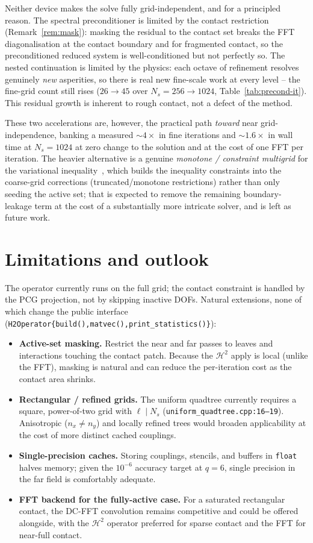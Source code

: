 \documentclass[11pt,a4paper]{article}
\newcommand{\Htwo}{\mathcal{H}^2}
\newcommand{\code}[1]{\texttt{#1}}
\theoremstyle{definition}
\theoremstyle{remark}
\begin{document}
Neither device makes the solve fully grid-independent, and for a principled
reason. The spectral preconditioner is limited by the contact restriction
(Remark~\ref{rem:mask}): masking the residual to the contact set breaks the FFT
diagonalisation at the contact boundary and for fragmented contact, so the
preconditioned reduced system is well-conditioned but not perfectly so. The
nested continuation is limited by the physics: each octave of refinement resolves
genuinely \emph{new} asperities, so there is real new fine-scale work at every
level -- the fine-grid count still rises ($26\!\to\!45$ over $N_s=256\!\to\!1024$,
Table~\ref{tab:precond-it}). This residual growth is inherent to rough contact,
not a defect of the method.

These two accelerations are, however, the practical path \emph{toward} near
grid-independence, banking a measured $\sim4\times$ in fine iterations and
$\sim1.6\times$ in wall time at $N_s=1024$ at zero change to the solution and at
the cost of one FFT per iteration. The heavier alternative is a genuine
\emph{monotone / constraint multigrid} for the variational
inequality~\cite{Kornhuber1994}, which builds the inequality constraints into the
coarse-grid corrections (truncated/monotone restrictions) rather than only seeding
the active set; that is expected to remove the remaining boundary-leakage term at
the cost of a substantially more intricate solver, and is left as future work.

\section{Limitations and outlook}
\label{sec:outlook}

The operator currently runs on the full grid; the contact constraint is handled
by the PCG projection, not by skipping inactive DOFs. Natural extensions, none of
which change the public interface
(\code{H2Operator\{build(),matvec(),print\_statistics()\}}):
\begin{itemize}
\item \textbf{Active-set masking.} Restrict the near and far passes to leaves and
interactions touching the contact patch. Because the $\Htwo$ apply is local
(unlike the FFT), masking is natural and can reduce the per-iteration cost as the
contact area shrinks.
\item \textbf{Rectangular / refined grids.} The uniform quadtree currently
requires a square, power-of-two grid with $\ell\mid N_s$
(\code{uniform\_quadtree.cpp:16--19}). Anisotropic ($n_x\ne n_y$) and locally
refined trees would broaden applicability at the cost of more distinct cached
couplings.
\item \textbf{Single-precision caches.} Storing couplings, stencils, and buffers
in \code{float} halves memory; given the $10^{-6}$ accuracy target at $q=6$,
single precision in the far field is comfortably adequate.
\item \textbf{FFT backend for the fully-active case.} For a saturated rectangular
contact, the DC-FFT convolution remains competitive and could be offered
alongside, with the $\Htwo$ operator preferred for sparse contact and the FFT for
near-full contact.
\end{itemize}
\end{document}
